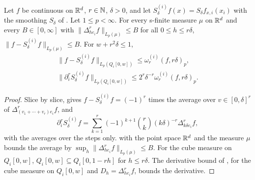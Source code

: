 \begin{lemma}
\label{lem:cube-smoothing}
\leanok
{}
Let $f$ be continuous on $\mathbb{R}^d$, $r \in \mathbb{N}$, $\delta > 0$, and let
$S^{(i)}_\delta f(x) = S_\delta f_{x,i}(x_i)$ with the smoothing $S_\delta$ of
. Let $1 \leq p < \infty$. For every s-finite measure $\mu$ on
$\mathbb{R}^d$ and every $B \in [0, \infty]$ with $\|\Delta^r_{h e_i} f\|_{L_p(\mu)} \leq B$ for all
$0 \leq h \leq r\delta$, $\|f - S^{(i)}_\delta f\|_{L_p(\mu)} \leq B$. For $w + r^2 \delta \leq 1$,
\begin{gather*}
  \|f - S^{(i)}_\delta f\|_{L_p(Q_i[0, w])} \leq \omega_r^{(i)}(f, r\delta)_p , \\
  \|\partial_i^r S^{(i)}_\delta f\|_{L_p(Q_i[0, w])} \leq 2^r \delta^{-r} \omega_r^{(i)}(f, r\delta)_p .
\end{gather*}
\end{lemma}

\begin{proof}
\leanok
Slice by slice,  gives $f - S^{(i)}_\delta f = (-1)^r$ times the
average over $v \in [0, \delta]^r$ of $\Delta^r_{(v_1 + \cdots + v_r) e_i} f$, and
\[
  \partial_i^r S^{(i)}_\delta f
  = \sum_{k=1}^r (-1)^{k+1} \binom{r}{k} (k\delta)^{-r} \Delta^r_{k\delta e_i} f ,
\]
with the averages over the steps only.  with
the point space $\mathbb{R}^d$ and the measure $\mu$ bounds the average by
$\sup_h \|\Delta^r_{h e_i} f\|_{L_p(\mu)} \leq B$. For the cube measure on $Q_i[0, w]$,
$Q_i[0, w] \subseteq Q_i[0, 1 - rh]$ for $h \leq r \delta$. The derivative bound of
, for the cube measure on
$Q_i[0, w]$ and $D_h = \Delta^r_{h e_i} f$, bounds the derivative.
\end{proof}

